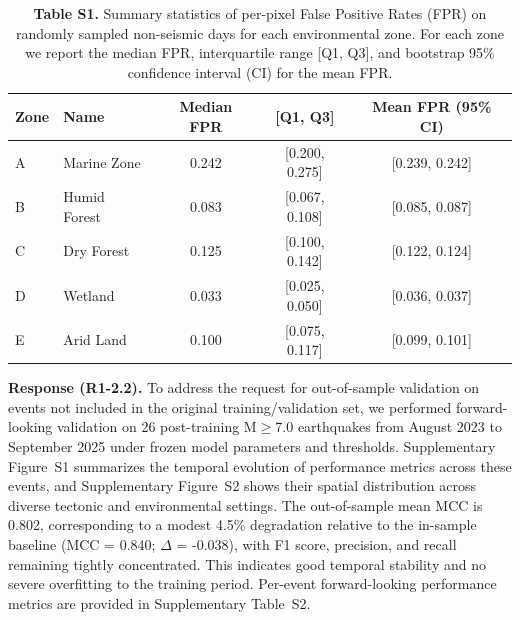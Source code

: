 \documentclass[12pt]{article}
\newcommand{\revresponse}[1]{\begingroup\color{responsecolor}#1\endgroup}
\begin{document}
{\begin{table}[H]
\small
\centering
\caption*{\textbf{Table S1.} Summary statistics of per-pixel False Positive Rates (FPR) on randomly sampled non-seismic days for each environmental zone. For each zone we report the median FPR, interquartile range [Q1, Q3], and bootstrap 95\% confidence interval (CI) for the mean FPR.}
\begin{tabular}{@{}llccc@{}}
\toprule
Zone & Name          & Median FPR & [Q1, Q3]        & Mean FPR (95\% CI)        \\
\midrule
A    & Marine Zone   & 0.242      & [0.200, 0.275]  & [0.239, 0.242] \\
B    & Humid Forest  & 0.083      & [0.067, 0.108]  & [0.085, 0.087] \\
C    & Dry Forest    & 0.125      & [0.100, 0.142]  & [0.122, 0.124] \\
D    & Wetland       & 0.033      & [0.025, 0.050]  & [0.036, 0.037] \\
E    & Arid Land     & 0.100      & [0.075, 0.117]  & [0.099, 0.101] \\
\bottomrule
\end{tabular}
\end{table}
}

\revresponse{%
\textbf{Response (R1-2.2).} To address the request for out-of-sample validation on events not included in the original training/validation set, we performed forward-looking validation on 26 post-training M$\ge$7.0 earthquakes from August 2023 to September 2025 under frozen model parameters and thresholds. Supplementary Figure~S1 summarizes the temporal evolution of performance metrics across these events, and Supplementary Figure~S2 shows their spatial distribution across diverse tectonic and environmental settings. The out-of-sample mean MCC is 0.802, corresponding to a modest 4.5\% degradation relative to the in-sample baseline (MCC = 0.840; $\Delta$ = -0.038), with F1 score, precision, and recall remaining tightly concentrated. This indicates good temporal stability and no severe overfitting to the training period. Per-event forward-looking performance metrics are provided in Supplementary Table~S2.
}
\end{document}
